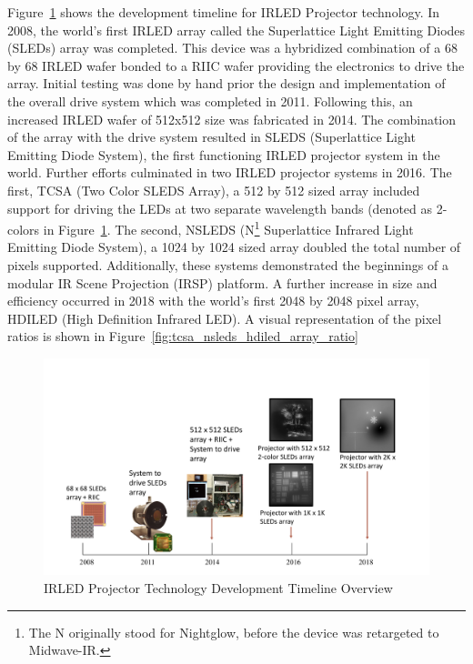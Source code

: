     Figure~\ref{fig:sleds_timeline} shows the development timeline for IRLED Projector technology. In 2008, the world's first IRLED array called the Superlattice Light Emitting Diodes (SLEDs) array was completed\cite{ahmed1}. This device was a hybridized combination of a 68 by 68 IRLED wafer bonded to a RIIC wafer\cite{das2} providing the electronics to drive the array. Initial testing was done by hand prior the design and implementation of the overall drive system which was completed in 2011. Following this, an increased IRLED wafer of 512x512 size was fabricated in 2014\cite{norton1}. The combination of the array with the drive system resulted in SLEDS (Superlattice Light Emitting Diode System), the first functioning IRLED projector system in the world. Further efforts culminated in two IRLED projector systems in 2016. The first, TCSA (Two Color SLEDS Array), a 512 by 512 sized array\cite{McGeeEtAl2015, ejzak1, ejzak2, EjzakEtAl2016, RickerEtAl2017} included support for driving the LEDs at two separate wavelength bands (denoted as 2-colors in Figure~\ref{fig:sleds_timeline}. The second, NSLEDS (N\footnote{The N originally stood for Nightglow, before the device was retargeted to Midwave-IR.} Superlattice Infrared Light Emitting Diode System), a 1024 by 1024 sized array\cite{benedict1} doubled the total number of pixels supported. Additionally, these systems demonstrated the beginnings of a modular IR Scene Projection (IRSP) platform\cite{BrowningEtAl2019}. A further increase in size and efficiency occurred in 2018 with the world's first 2048 by 2048 pixel array, HDILED (High Definition Infrared LED). A visual representation of the pixel ratios is shown in Figure~\ref{fig:tcsa_nsleds_hdiled_array_ratio}

    \begin{figure}
        \centering
        \includegraphics[trim=0.5in 0.5in 0.5in 1.5in,width=1.0\textwidth]{fig/sleds_timeline.pdf}
        \caption{IRLED Projector Technology Development Timeline Overview}
        \label{fig:sleds_timeline}
    \end{figure}


